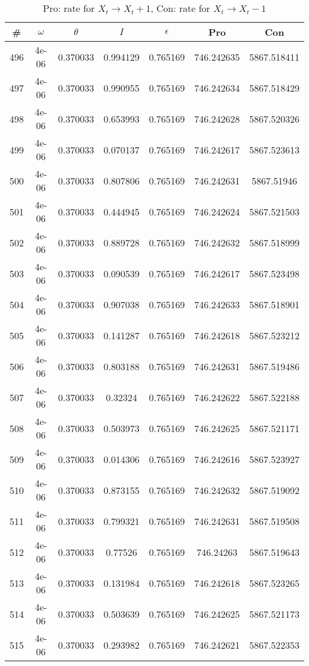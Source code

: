 \newpage
\begin{table}
\caption{Pro: rate for $X_t \rightarrow X_t + 1$, Con: rate for $X_t \rightarrow X_t - 1$}
\begin{tabular*}{\linewidth}{c|c|c|c|c|c|c}
\# & $\omega$ & $\theta$ & $I$ & $\epsilon$ & Pro & Con \\
\hline
496 & 4e-06 & 0.370033 & 0.994129 & 0.765169 & 746.242635 & 5867.518411\\
497 & 4e-06 & 0.370033 & 0.990955 & 0.765169 & 746.242634 & 5867.518429\\
498 & 4e-06 & 0.370033 & 0.653993 & 0.765169 & 746.242628 & 5867.520326\\
499 & 4e-06 & 0.370033 & 0.070137 & 0.765169 & 746.242617 & 5867.523613\\
500 & 4e-06 & 0.370033 & 0.807806 & 0.765169 & 746.242631 & 5867.51946\\
501 & 4e-06 & 0.370033 & 0.444945 & 0.765169 & 746.242624 & 5867.521503\\
502 & 4e-06 & 0.370033 & 0.889728 & 0.765169 & 746.242632 & 5867.518999\\
503 & 4e-06 & 0.370033 & 0.090539 & 0.765169 & 746.242617 & 5867.523498\\
504 & 4e-06 & 0.370033 & 0.907038 & 0.765169 & 746.242633 & 5867.518901\\
505 & 4e-06 & 0.370033 & 0.141287 & 0.765169 & 746.242618 & 5867.523212\\
506 & 4e-06 & 0.370033 & 0.803188 & 0.765169 & 746.242631 & 5867.519486\\
507 & 4e-06 & 0.370033 & 0.32324 & 0.765169 & 746.242622 & 5867.522188\\
508 & 4e-06 & 0.370033 & 0.503973 & 0.765169 & 746.242625 & 5867.521171\\
509 & 4e-06 & 0.370033 & 0.014306 & 0.765169 & 746.242616 & 5867.523927\\
510 & 4e-06 & 0.370033 & 0.873155 & 0.765169 & 746.242632 & 5867.519092\\
511 & 4e-06 & 0.370033 & 0.799321 & 0.765169 & 746.242631 & 5867.519508\\
512 & 4e-06 & 0.370033 & 0.77526 & 0.765169 & 746.24263 & 5867.519643\\
513 & 4e-06 & 0.370033 & 0.131984 & 0.765169 & 746.242618 & 5867.523265\\
514 & 4e-06 & 0.370033 & 0.503639 & 0.765169 & 746.242625 & 5867.521173\\
515 & 4e-06 & 0.370033 & 0.293982 & 0.765169 & 746.242621 & 5867.522353\\

\end{tabular*}
\end{table}
